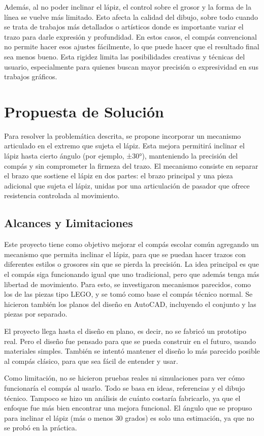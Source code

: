 \documentclass[11pt, a4paper]{article}
\begin{document}
Además, al no poder inclinar el lápiz, el control sobre el grosor y la forma de la línea se vuelve más limitado. Esto afecta la calidad del dibujo, sobre todo cuando se trata de trabajos más detallados o artísticos donde es importante variar el trazo para darle expresión y profundidad. En estos casos, el compás convencional no permite hacer esos ajustes fácilmente, lo que puede hacer que el resultado final sea menos bueno. Esta rigidez limita las posibilidades creativas y técnicas del usuario, especialmente para quienes buscan mayor precisión o expresividad en sus trabajos gráficos.

\section{Propuesta de Solución}
Para resolver la problemática descrita, se propone incorporar un mecanismo articulado en el extremo que sujeta el lápiz. Esta mejora permitirá inclinar el lápiz hasta cierto ángulo (por ejemplo, ±30°), manteniendo la precisión del compás y sin comprometer la firmeza del trazo. El mecanismo consiste en separar el brazo que sostiene el lápiz en dos partes: el brazo principal y una pieza adicional que sujeta el lápiz, unidas por una articulación de pasador que ofrece resistencia controlada al movimiento.

\subsection{Alcances y Limitaciones}
Este proyecto tiene como objetivo mejorar el compás escolar común agregando un mecanismo que permita inclinar el lápiz, para que se puedan hacer trazos con diferentes estilos o grosores sin que se pierda la precisión. La idea principal es que el compás siga funcionando igual que uno tradicional, pero que además tenga más libertad de movimiento. Para esto, se investigaron mecanismos parecidos, como los de las piezas tipo LEGO, y se tomó como base el compás técnico normal. Se hicieron también los planos del diseño en AutoCAD, incluyendo el conjunto y las piezas por separado.

El proyecto llega hasta el diseño en plano, es decir, no se fabricó un prototipo real. Pero el diseño fue pensado para que se pueda construir en el futuro, usando materiales simples. También se intentó mantener el diseño lo más parecido posible al compás clásico, para que sea fácil de entender y usar.

Como limitación, no se hicieron pruebas reales ni simulaciones para ver cómo funcionaría el compás al usarlo. Todo se basa en ideas, referencias y el dibujo técnico. Tampoco se hizo un análisis de cuánto costaría fabricarlo, ya que el enfoque fue más bien encontrar una mejora funcional. El ángulo que se propuso para inclinar el lápiz (más o menos 30 grados) es solo una estimación, ya que no se probó en la práctica.
\end{document}
